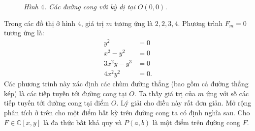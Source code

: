 \begin{multicols}{2}
\begin{figure}[H]
		\caption{\small$F=x^3+x^2-y^2$ \quad$F=(x^2 + y^2)^3- 4x^2y^2$}
		\caption{\small\textit{\color{duongvaotoanhoc}Hình $4$. Các đường cong với kỳ dị tại $O(0,0)$.}}
		\vspace*{-5pt}
	\end{figure}
	Trong các đồ thị ở hình $4$, giá trị $m$ tương ứng là $2,2,3,4$. Phương trình
	$F_m=0$
	tương ứng là:
	\begin{align*}
		y^2&=0\\
		x^2-y^2&=0\\
		3x^2y-y^3&=0\\
		4x^2y^2&=0.
	\end{align*} 
	Các phương trình này xác định các chùm đường thẳng (bao gồm cả đường thẳng kép) là các tiếp tuyến tới đường cong tại $O$. 
	\vskip 0.1cm
	Ta thấy giá trị của $m$ ứng với số các tiếp tuyến tới đường cong tại điểm $O$. Lý giải cho điều này rất đơn giản. 
	\vskip 0.2cm
	\vskip 0.2cm
	Mở rộng phân tích ở trên cho một điểm bất kỳ trên đường cong ta có định nghĩa sau. 
	Cho $F\in \mathbb C[x,y]$ là đa thức bất khả quy và $P(a,b)$ là một điểm trên đường cong $F$. 
	\vskip 0.1cm
	\vspace*{0.1pt}
	

\end{multicols}

